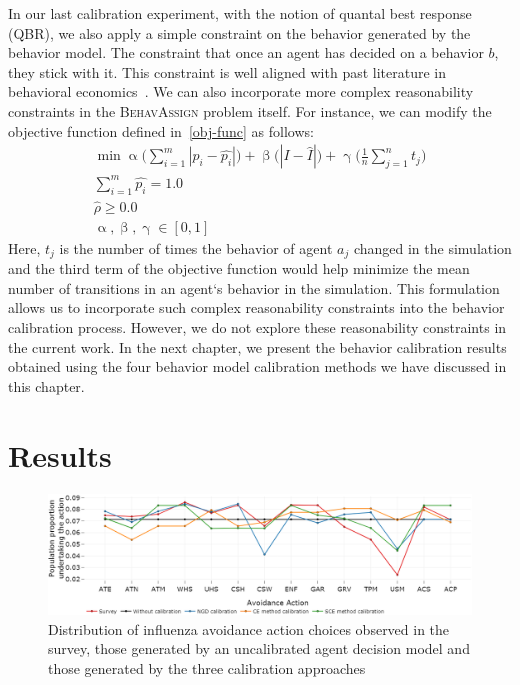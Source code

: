 \documentclass[doublespace]{VTthesis}
\begin{document}
    In our last calibration experiment, with the notion of quantal best response (QBR), we also apply a simple constraint on the behavior generated by the behavior model. The constraint that once an agent has decided on a behavior $b$, they stick with it. This constraint is well aligned with past literature in behavioral economics~\cite{ariely2008predictably}. We can also incorporate more complex reasonability constraints in the \textsc{BehavAssign} problem itself. For instance, we can modify the objective function defined in~\ref{obj-func} as follows:
    \begin{align*}
        \min \upalpha \bigg(\sum_{i=1}^{m}|p_i - \hat{p_i}|\bigg) + \upbeta \bigg(|I - \hat{I}| \bigg) + \upgamma \bigg(\frac{1}{n} \sum_{j=1}^{n} t_j \bigg) \\
        \sum_{i=1}^{m} \hat{p_i} = 1.0 \\
        \hat{\rho} \ge 0.0\\
        \upalpha, \upbeta, \upgamma \in [0, 1]
    \end{align*}
    Here, $t_j$ is the number of times the behavior of agent $a_j$ changed in the simulation and the third term of the objective function would help minimize the mean number of transitions in an agent`s behavior in the simulation. This formulation allows us to incorporate such complex reasonability constraints into the behavior calibration process. However, we do not explore these reasonability constraints in the current work. In the next chapter, we present the behavior calibration results obtained using the four behavior model calibration methods we have discussed in this chapter. 
    
	\chapter{Results} \label{ch:results}
	\begin{figure}
    \centering
    \includegraphics[width=\textwidth]{figures/marginals.png}
    \caption{Distribution of influenza avoidance action choices observed in the survey, those generated by an uncalibrated agent decision model and those generated by the three calibration approaches}
    \label{fig:marginals}
    \end{figure}
    
\end{document}
